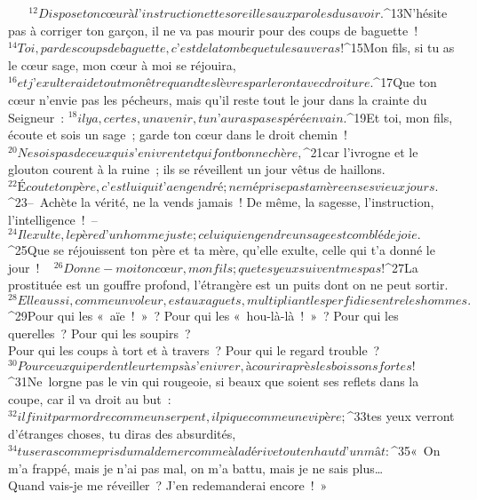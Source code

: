            
         
${}^{12}Dispose ton cœur à l’instruction
        et tes oreilles aux paroles du savoir.
        
           
         
${}^{13}N’hésite pas à corriger ton garçon,
        il ne va pas mourir pour des coups de baguette !
${}^{14}Toi, par des coups de baguette,
        c’est de la tombe que tu le sauveras !
        
           
${}^{15}Mon fils, si tu as le cœur sage,
        mon cœur à moi se réjouira,
${}^{16}et j’exulterai de tout mon être
        quand tes lèvres parleront avec droiture.
         
${}^{17}Que ton cœur n’envie pas les pécheurs,
        mais qu’il reste tout le jour dans la crainte du Seigneur :
${}^{18}il y a, certes, un avenir,
        tu n’auras pas espéré en vain.
         
${}^{19}Et toi, mon fils, écoute et sois un sage ;
        garde ton cœur dans le droit chemin !
${}^{20}Ne sois pas de ceux qui s’enivrent
        et qui font bonne chère,
${}^{21}car l’ivrogne et le glouton courent à la ruine ;
        ils se réveillent un jour vêtus de haillons.
         
${}^{22}Écoute ton père, c’est lui qui t’a engendré ;
        ne méprise pas ta mère en ses vieux jours.
${}^{23}– Achète la vérité, ne la vends jamais !
        De même, la sagesse, l’instruction, l’intelligence ! – 
${}^{24}Il exulte, le père d’un homme juste ;
        celui qui engendre un sage est comblé de joie.
${}^{25}Que se réjouissent ton père et ta mère,
        qu’elle exulte, celle qui t’a donné le jour !
         
${}^{26}Donne-moi ton cœur, mon fils ;
        que tes yeux suivent mes pas !
${}^{27}La prostituée est un gouffre profond,
        l’étrangère est un puits dont on ne peut sortir.
${}^{28}Elle aussi, comme un voleur, est aux aguets,
        multipliant les perfidies entre les hommes.
${}^{29}Pour qui les « aïe ! » ? Pour qui les « hou-là-là ! » ?
        Pour qui les querelles ? Pour qui les soupirs ?
        \\Pour qui les coups à tort et à travers ?
        Pour qui le regard trouble ?
${}^{30}Pour ceux qui perdent leur temps à s’enivrer,
        à courir après les boissons fortes !
${}^{31}Ne lorgne pas le vin qui rougeoie,
        si beaux que soient ses reflets dans la coupe,
        car il va droit au but :
${}^{32}il finit par mordre comme un serpent,
        il pique comme une vipère ;
${}^{33}tes yeux verront d’étranges choses,
        tu diras des absurdités,
${}^{34}tu seras comme pris du mal de mer
        comme à la dérive tout en haut d’un mât :
${}^{35}« On m’a frappé, mais je n’ai pas mal,
        on m’a battu, mais je ne sais plus…
        \\Quand vais-je me réveiller ?
        J’en redemanderai encore ! »
       
      

